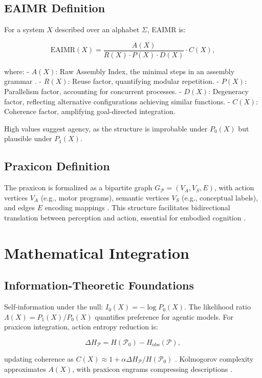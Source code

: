 \documentclass{article}
\begin{document}
\subsection{EAIMR Definition}
For a system \(X\) described over an alphabet \(\Sigma\), EAIMR is:

\[
\text{EAIMR}(X) = \frac{A(X)}{R(X) \cdot P(X) \cdot D(X)} \cdot C(X),
\]

where:
- \(A(X)\): Raw Assembly Index, the minimal steps in an assembly grammar \citep{walker2013}.
- \(R(X)\): Reuse factor, quantifying modular repetition.
- \(P(X)\): Parallelism factor, accounting for concurrent processes.
- \(D(X)\): Degeneracy factor, reflecting alternative configurations achieving similar functions.
- \(C(X)\): Coherence factor, amplifying goal-directed integration.

High values suggest agency, as the structure is improbable under \(P_0(X)\) but plausible under \(P_1(X)\).

\subsection{Praxicon Definition}
The praxicon is formalized as a bipartite graph \(G_{\mathcal{P}} = (V_A, V_S, E)\), with action vertices \(V_A\) (e.g., motor programs), semantic vertices \(V_S\) (e.g., conceptual labels), and edges \(E\) encoding mappings \citep{panunzi2018}. This structure facilitates bidirectional translation between perception and action, essential for embodied cognition \citep{barsalou2008}.

\section{Mathematical Integration}
\label{sec:integration}

\subsection{Information-Theoretic Foundations}
Self-information under the null: \(I_0(X) = -\log P_0(X)\). The likelihood ratio \(\Lambda(X) = P_1(X)/P_0(X)\) quantifies preference for agentic models. For praxicon integration, action entropy reduction is:

\[
\Delta H_{\mathcal{P}} = H(\mathcal{P}_0) - H_{\text{obs}}(\mathcal{P}),
\]

updating coherence as \(C(X) \approx 1 + \alpha \Delta H_{\mathcal{P}} / H(\mathcal{P}_0)\) \citep{shannon1948, jaynes2003}. Kolmogorov complexity approximates \(A(X)\), with praxicon engrams compressing descriptions \citep{kolmogorov1965}.
\end{document}
